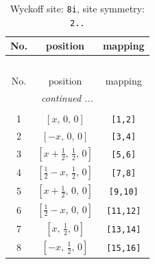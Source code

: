\documentclass[fleqn,8pt]{jsarticle}
\begin{document}
\renewcommand{\arraystretch}{1.2}
\begin{longtable}{ccc}
\caption{Wyckoff site: {\tt 8i}, site symmetry: {\tt 2..}}
 \\
 \hline \hline
No. & position & mapping \\ \hline \endfirsthead

\multicolumn{2}{l}{\tablename\ \thetable{}} \\
 \hline \hline
No. & position & mapping \\ \hline \endhead

 \hline \hline
\multicolumn{2}{r}{\footnotesize\it continued ...} \\ \endfoot

 \hline \hline
\multicolumn{2}{r}{} \\ \endlastfoot

1 & $\left[ x,\, 0,\, 0 \right]$ & {\tt [1,2]} \\ \hline
2 & $\left[ - x,\, 0,\, 0 \right]$ & {\tt [3,4]} \\ \hline
3 & $\left[ x + \frac{1}{2},\, \frac{1}{2},\, 0 \right]$ & {\tt [5,6]} \\ \hline
4 & $\left[ \frac{1}{2} - x,\, \frac{1}{2},\, 0 \right]$ & {\tt [7,8]} \\ \hline
5 & $\left[ x + \frac{1}{2},\, 0,\, 0 \right]$ & {\tt [9,10]} \\ \hline
6 & $\left[ \frac{1}{2} - x,\, 0,\, 0 \right]$ & {\tt [11,12]} \\ \hline
7 & $\left[ x,\, \frac{1}{2},\, 0 \right]$ & {\tt [13,14]} \\ \hline
8 & $\left[ - x,\, \frac{1}{2},\, 0 \right]$ & {\tt [15,16]} \\
\end{longtable}
\renewcommand{\arraystretch}{1.2}
\end{document}
